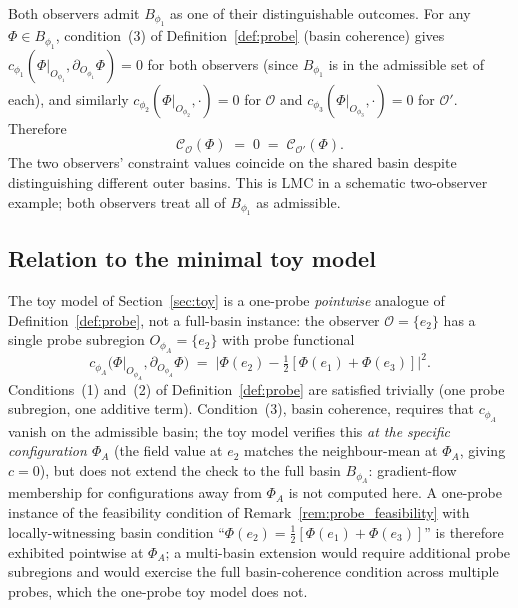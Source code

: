 \documentclass[12pt]{article}
\newcommand{\Ocal}{\mathcal{O}}
\newcommand{\Ccal}{\mathcal{C}}
\begin{document}
Both observers admit $B_{\phi_1}$ as one of their distinguishable outcomes. For any $\Phi \in B_{\phi_1}$, condition~(3) of Definition~\ref{def:probe} (basin coherence) gives $c_{\phi_1}(\Phi|_{O_{\phi_1}}, \partial_{O_{\phi_1}}\Phi) = 0$ for both observers (since $B_{\phi_1}$ is in the admissible set of each), and similarly $c_{\phi_2}(\Phi|_{O_{\phi_2}}, \cdot) = 0$ for $\Ocal$ and $c_{\phi_3}(\Phi|_{O_{\phi_3}}, \cdot) = 0$ for $\Ocal'$. Therefore
\begin{equation}
    \Ccal_\Ocal(\Phi) \;=\; 0 \;=\; \Ccal_{\Ocal'}(\Phi).
\end{equation}
The two observers' constraint values coincide on the shared basin despite distinguishing different outer basins. This is LMC in a schematic two-observer example; both observers treat all of $B_{\phi_1}$ as admissible.

\subsection{Relation to the minimal toy model}\label{subsec:toy_relation}

The toy model of Section~\ref{sec:toy} is a one-probe \emph{pointwise} analogue of Definition~\ref{def:probe}, not a full-basin instance: the observer $\Ocal = \{e_2\}$ has a single probe subregion $O_{\phi_A} = \{e_2\}$ with probe functional
\begin{equation}
    c_{\phi_A}\!\bigl(\Phi|_{O_{\phi_A}}, \partial_{O_{\phi_A}} \Phi\bigr) \;=\; \bigl|\Phi(e_2) - \tfrac12[\Phi(e_1) + \Phi(e_3)]\bigr|^2.
\end{equation}
Conditions~(1) and~(2) of Definition~\ref{def:probe} are satisfied trivially (one probe subregion, one additive term). Condition~(3), basin coherence, requires that $c_{\phi_A}$ vanish on the admissible basin; the toy model verifies this \emph{at the specific configuration $\Phi_A$} (the field value at $e_2$ matches the neighbour-mean at $\Phi_A$, giving $c = 0$), but does not extend the check to the full basin $B_{\phi_A}$: gradient-flow membership for configurations away from $\Phi_A$ is not computed here. A one-probe instance of the feasibility condition of Remark~\ref{rem:probe_feasibility} with locally-witnessing basin condition ``$\Phi(e_2) = \tfrac12[\Phi(e_1) + \Phi(e_3)]$'' is therefore exhibited pointwise at $\Phi_A$; a multi-basin extension would require additional probe subregions and would exercise the full basin-coherence condition across multiple probes, which the one-probe toy model does not.
\end{document}
